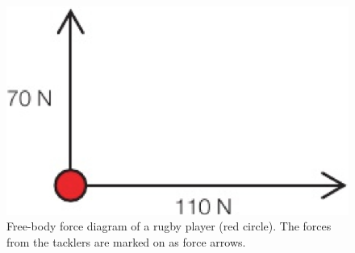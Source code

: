 \begin{figure}[H]
    \centering
    \includegraphics[scale=0.1]{Physics/1A/Images/1A-3-3.png}
    \caption{Free-body force diagram of a rugby player (red circle). The forces from the tacklers are marked on as force arrows.}
\end{figure}

